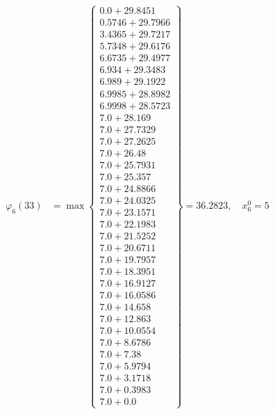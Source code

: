 \documentclass{article}
\begin{document}
\begin{align*}
  
\varphi_{6}(33) &= \max \left\{ \begin{array}{c}
0.0 + 29.8451 \\
 0.5746 + 29.7966 \\
 3.4365 + 29.7217 \\
 5.7348 + 29.6176 \\
 6.6735 + 29.4977 \\
 6.934 + 29.3483 \\
 6.989 + 29.1922 \\
 6.9985 + 28.8982 \\
 6.9998 + 28.5723 \\
 7.0 + 28.169 \\
 7.0 + 27.7329 \\
 7.0 + 27.2625 \\
 7.0 + 26.48 \\
 7.0 + 25.7931 \\
 7.0 + 25.357 \\
 7.0 + 24.8866 \\
 7.0 + 24.0325 \\
 7.0 + 23.1571 \\
 7.0 + 22.1983 \\
 7.0 + 21.5252 \\
 7.0 + 20.6711 \\
 7.0 + 19.7957 \\
 7.0 + 18.3951 \\
 7.0 + 16.9127 \\
 7.0 + 16.0586 \\
 7.0 + 14.658 \\
 7.0 + 12.863 \\
 7.0 + 10.0554 \\
 7.0 + 8.6786 \\
 7.0 + 7.38 \\
 7.0 + 5.9794 \\
 7.0 + 3.1718 \\
 7.0 + 0.3983 \\
 7.0 + 0.0
\end{array} \right\}=36.2823,\quad x_{6}^0=5\\
  
  
  

\end{align*}
\end{document}
